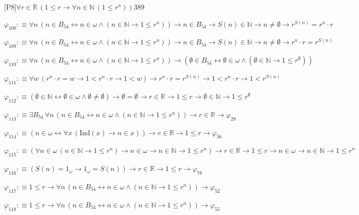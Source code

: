 \begin{fullproof}{[P8]}{$\forall r \in \mathbb{R}\,(1 \leq r \to \forall n \in \mathbb{N}\,(1 \leq {{r}^{n}}))$}{389}
\begin{abbrevlist}
\item $\varphi_{108} :\equiv \forall n\,(n \in B_{54} \leftrightarrow n \in \omega \land (n \in \mathbb{N} \to 1 \leq {{r}^{n}})) \to n \in B_{54} \to S(n) \in \mathbb{N} \to n \neq \emptyset \to {{r}^{S(n)}} = {{r}^{n}} \cdot r$
\item $\varphi_{109} :\equiv \forall n\,(n \in B_{54} \leftrightarrow n \in \omega \land (n \in \mathbb{N} \to 1 \leq {{r}^{n}})) \to n \in B_{54} \to S(n) \in \mathbb{N} \to n \neq \emptyset \to {{r}^{n}} \cdot r = {{r}^{S(n)}}$
\item $\varphi_{110} :\equiv \forall n\,(n \in B_{54} \leftrightarrow n \in \omega \land (n \in \mathbb{N} \to 1 \leq {{r}^{n}})) \to (\emptyset \in B_{54} \leftrightarrow \emptyset \in \omega \land (\emptyset \in \mathbb{N} \to 1 \leq {{r}^{\emptyset}}))$
\item $\varphi_{111} :\equiv \forall w\,({{r}^{n}} \cdot r = w \to 1 < {{r}^{n}} \cdot r \to 1 < w) \to {{r}^{n}} \cdot r = {{r}^{S(n)}} \to 1 < {{r}^{n}} \cdot r \to 1 < {{r}^{S(n)}}$
\item $\varphi_{112} :\equiv (\emptyset \in \mathbb{N} \leftrightarrow \emptyset \in \omega \land \emptyset \neq \emptyset) \to \emptyset = \emptyset \to r \in \mathbb{R} \to 1 \leq r \to \emptyset \in \mathbb{N} \to 1 \leq {{r}^{\emptyset}}$
\item $\varphi_{113} :\equiv \exists B_{54}\,\forall n\,(n \in B_{54} \leftrightarrow n \in \omega \land (n \in \mathbb{N} \to 1 \leq {{r}^{n}})) \to r \in \mathbb{R} \to \varphi_{28}$
\item $\varphi_{114} :\equiv (n \in \omega \leftrightarrow \forall x\,(\mathrm{Ind}(x) \to n \in x)) \to r \in \mathbb{R} \to 1 \leq r \to \varphi_{56}$
\item $\varphi_{115} :\equiv (\forall n \in \omega\,(n \in \mathbb{N} \to 1 \leq {{r}^{n}}) \to n \in \omega \to n \in \mathbb{N} \to 1 \leq {{r}^{n}}) \to r \in \mathbb{R} \to 1 \leq r \to n \in \omega \to n \in \mathbb{N} \to 1 \leq {{r}^{n}}$
\item $\varphi_{116} :\equiv (S(n) = 1_{\omega} \to 1_{\omega} = S(n)) \to r \in \mathbb{R} \to 1 \leq r \to \varphi_{78}$
\item $\varphi_{117} :\equiv 1 \leq r \to \forall n\,(n \in B_{54} \leftrightarrow n \in \omega \land (n \in \mathbb{N} \to 1 \leq {{r}^{n}})) \to \varphi_{52}$
\item $\varphi_{118} :\equiv 1 \leq r \to \forall n\,(n \in B_{54} \leftrightarrow n \in \omega \land (n \in \mathbb{N} \to 1 \leq {{r}^{n}})) \to \varphi_{55}$

\end{abbrevlist}
\end{fullproof}
